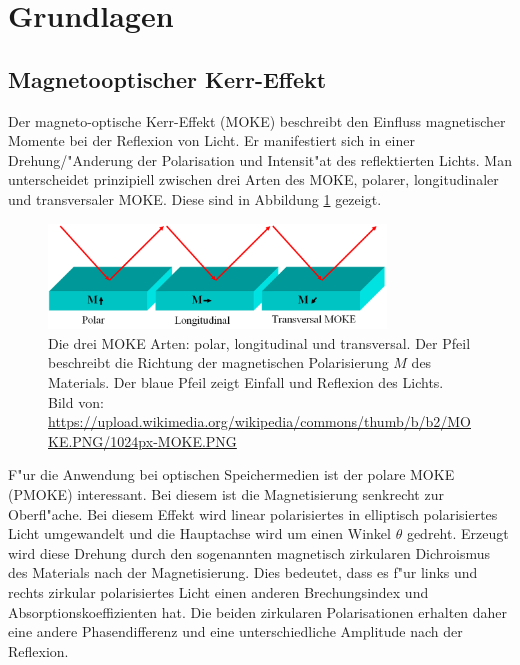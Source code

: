 \section{Grundlagen}
\subsection{Magnetooptischer Kerr-Effekt}
Der magneto-optische Kerr-Effekt (MOKE) beschreibt den Einfluss magnetischer Momente bei der Reflexion von Licht.
Er manifestiert sich in einer Drehung/"Anderung der Polarisation und Intensit"at des reflektierten Lichts.
Man unterscheidet prinzipiell zwischen drei Arten des MOKE, polarer, longitudinaler und transversaler MOKE.
Diese sind in Abbildung \ref{fig:moke_arten} gezeigt.
\begin{figure}[htpb]
    \centering
    \includegraphics[width=0.8\textwidth]{../images/moke_arten.png}
    \caption{
        Die drei MOKE Arten: polar, longitudinal und transversal.
        Der Pfeil beschreibt die Richtung der magnetischen Polarisierung $M$ des Materials.
        Der blaue Pfeil zeigt Einfall und Reflexion des Lichts.\\
        Bild von: \url{https://upload.wikimedia.org/wikipedia/commons/thumb/b/b2/MOKE.PNG/1024px-MOKE.PNG}
        }
        \label{fig:moke_arten}
\end{figure}

F"ur die Anwendung bei optischen Speichermedien ist der polare MOKE (PMOKE) interessant.
Bei diesem ist die Magnetisierung senkrecht zur Oberfl"ache.
Bei diesem Effekt wird linear polarisiertes in elliptisch polarisiertes Licht umgewandelt und die Hauptachse wird um einen Winkel $\theta$ gedreht.
Erzeugt wird diese Drehung durch den sogenannten magnetisch zirkularen Dichroismus des Materials nach der Magnetisierung.
Dies bedeutet, dass es f"ur links und rechts zirkular polarisiertes Licht einen anderen Brechungsindex und Absorptionskoeffizienten hat.
Die beiden zirkularen Polarisationen erhalten daher eine andere Phasendifferenz und eine unterschiedliche Amplitude nach der Reflexion.
\cite{wikikerr}


